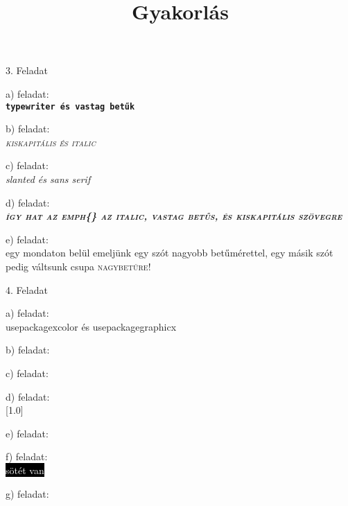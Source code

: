 \documentclass{article} %
\begin{document}
\title{Gyakorlás}
\maketitle
{\large 3. Feladat}

a) feladat:\\
	\texttt{\textbf{typewriter és vastag betűk}}
	
b) feladat:\\
	\textsc{\textit{kiskapitális és italic}}
	
c) feladat:\\
	\textsl{\textsl{slanted és sans serif}}

d) feladat:\\
	\emph{\textit{\textbf{\textsc{így hat az emph\{\} az italic, vastag betűs, és kiskapitális szövegre}}}}
	
e) feladat:\\
	egy mondaton belül emeljünk egy szót {\Huge nagyobb} betűmérettel, egy másik
szót pedig váltsunk csupa \textsc{nagybetűre!}


{\large 4. Feladat}

a) feladat:\\
	usepackage{xcolor} és usepackage{graphicx}
	
b) feladat:\\
	
c) feladat:\\

d) feladat:\\
	\scalebox{2.0}[1.0]{}
	
e) feladat:\\

f) feladat:\\
	\textcolor{white}{\colorbox{black}{sötét van}}

g) feladat:\\
	\textcolor{red}{}
\end{document}
